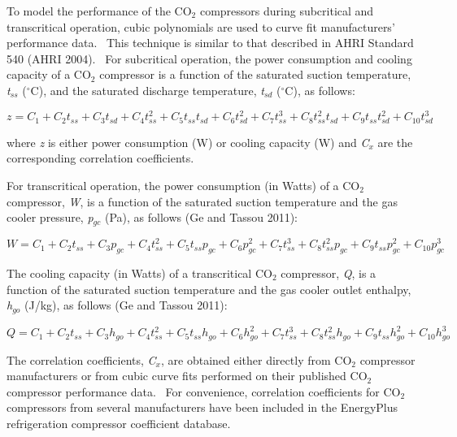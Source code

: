 To model the performance of the CO\(_{2}\) compressors during subcritical and transcritical operation, cubic polynomials are used to curve fit manufacturers' performance data.~ This technique is similar to that described in AHRI Standard 540 (AHRI 2004).~ For subcritical operation, the power consumption and cooling capacity of a CO\(_{2}\) compressor is a function of the saturated suction temperature, \emph{t\(_{ss}\)} (\(^{\circ}\)C), and the saturated discharge temperature, \emph{t\(_{sd}\)} (\(^{\circ}\)C), as follows:

\begin{equation}
z = {C_1} + {C_2}{t_{ss}} + {C_3}{t_{sd}} + {C_4}t_{ss}^2 + {C_5}{t_{ss}}{t_{sd}} + {C_6}t_{sd}^2 + {C_7}t_{ss}^3 + {C_8}t_{ss}^2{t_{sd}} + {C_9}{t_{ss}}t_{sd}^2 + {C_{10}}t_{sd}^3
\end{equation}

where \emph{z} is either power consumption (W) or cooling capacity (W) and \emph{C\(_{x}\)} are the corresponding correlation coefficients.

For transcritical operation, the power consumption (in Watts) of a CO\(_{2}\) compressor, \emph{W}, is a function of the saturated suction temperature and the gas cooler pressure, \emph{p\(_{gc}\)} (Pa), as follows (Ge and Tassou 2011):

\begin{equation}
W = {C_1} + {C_2}{t_{ss}} + {C_3}{p_{gc}} + {C_4}t_{ss}^2 + {C_5}{t_{ss}}{p_{gc}} + {C_6}p_{gc}^2 + {C_7}t_{ss}^3 + {C_8}t_{ss}^2{p_{gc}} + {C_9}{t_{ss}}p_{gc}^2 + {C_{10}}p_{gc}^3
\end{equation}

The cooling capacity (in Watts) of a transcritical CO\(_{2}\) compressor, \emph{Q}, is a function of the saturated suction temperature and the gas cooler outlet enthalpy, \emph{h\(_{go}\)} (J/kg), as follows (Ge and Tassou 2011):

\begin{equation}
Q = {C_1} + {C_2}{t_{ss}} + {C_3}{h_{go}} + {C_4}t_{ss}^2 + {C_5}{t_{ss}}{h_{go}} + {C_6}h_{go}^2 + {C_7}t_{ss}^3 + {C_8}t_{ss}^2{h_{go}} + {C_9}{t_{ss}}h_{go}^2 + {C_{10}}h_{go}^3
\end{equation}

The correlation coefficients, \emph{C\(_{x}\)}, are obtained either directly from CO\(_{2}\) compressor manufacturers or from cubic curve fits performed on their published CO\(_{2}\) compressor performance data.~ For convenience, correlation coefficients for CO\(_{2}\) compressors from several manufacturers have been included in the EnergyPlus refrigeration compressor coefficient database.

